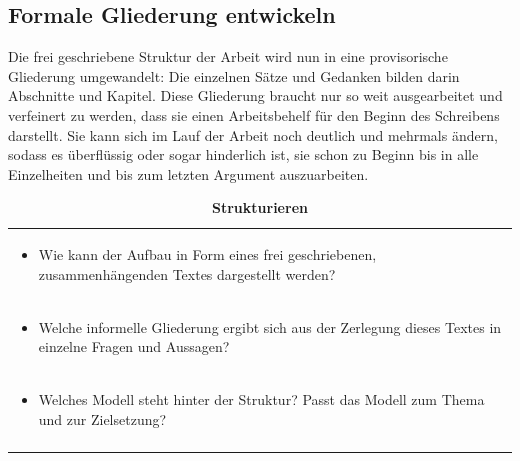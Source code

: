 \documentclass[]{book}
\providecommand{\tightlist}{%
  \setlength{\itemsep}{0pt}\setlength{\parskip}{0pt}}
\theoremstyle{definition}
\theoremstyle{definition}
\theoremstyle{definition}
\theoremstyle{remark}
\begin{document}
\subsection{Formale Gliederung
entwickeln}\label{formale-gliederung-entwickeln}

Die frei geschriebene Struktur der Arbeit wird nun in eine provisorische
Gliederung umgewandelt: Die einzelnen Sätze und Gedanken bilden darin
Abschnitte und Kapitel. Diese Gliederung braucht nur so weit
ausgearbeitet und verfeinert zu werden, dass sie einen Arbeitsbehelf für
den Beginn des Schreibens darstellt. Sie kann sich im Lauf der Arbeit
noch deutlich und mehrmals ändern, sodass es überflüssig oder sogar
hinderlich ist, sie schon zu Beginn bis in alle Einzelheiten und bis zum
letzten Argument auszuarbeiten.

\begin{longtable}[]{@{}l@{}}
\caption{\textbf{\label{tab:strukturieren} Strukturieren}}\tabularnewline
\toprule
\begin{minipage}[t]{0.97\columnwidth}\raggedright\strut
\begin{itemize}
\tightlist
\item
  Wie kann der Aufbau in Form eines frei geschriebenen,
  zusammenhängenden Textes dargestellt werden? \vspace{-6mm}
\end{itemize}\strut
\end{minipage}\tabularnewline
\begin{minipage}[t]{0.97\columnwidth}\raggedright\strut
\begin{itemize}
\tightlist
\item
  Welche informelle Gliederung ergibt sich aus der Zerlegung dieses
  Textes in einzelne Fragen und Aussagen? \vspace{-6mm}
\end{itemize}\strut
\end{minipage}\tabularnewline
\begin{minipage}[t]{0.97\columnwidth}\raggedright\strut
\begin{itemize}
\tightlist
\item
  Welches Modell steht hinter der Struktur? Passt das Modell zum Thema
  und zur Zielsetzung? \vspace{-6mm}
\end{itemize}\strut
\end{minipage}\tabularnewline
\begin{minipage}[t]{0.97\columnwidth}\raggedright\strut
\begin{itemize}

\end{itemize}
\end{minipage}
\end{longtable}
\end{document}
